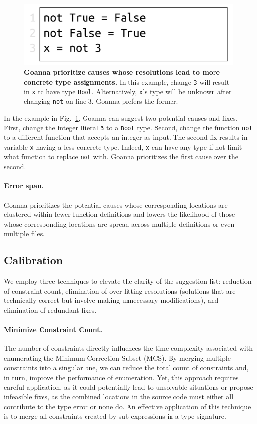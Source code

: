 \documentclass[pdflatex,sn-mathphys-num]{sn-jnl}%
\begin{document}
	
   \begin{figure}[ht!]
        \centering
        \includegraphics[width=0.5\linewidth]{images/Specificity}
        \caption[Goanna prioritize causes whose resolutions lead to more concrete type assignments]{\textbf{Goanna prioritize causes whose resolutions lead to more concrete type assignments.} In this example, change \texttt{3} will result in \texttt{x} to have type \texttt{Bool}. Alternatively, \texttt{x}'s type will be unknown after changing \texttt{not} on line 3. Goanna prefers the former.} 
        \label{fig:specificity}
    \end{figure}

    In the example in Fig.~\ref{fig:specificity}, Goanna can suggest two potential causes and fixes. First, change the integer literal \texttt{3} to a \texttt{Bool} type. Second, change the function \texttt{not} to a different function that accepts an integer as input. The second fix results in variable \texttt{x} having a less concrete type. Indeed, \texttt{x} can have any type if not limit what function to replace \texttt{not} with. Goanna prioritizes the first cause over the second. 

    \paragraph{Error span.}
    Goanna prioritizes the potential causes whose corresponding locations are clustered within fewer function definitions and lowers the likelihood of those whose corresponding locations are spread across multiple definitions or even multiple files.  

    
    \subsection{Calibration} \label{sub:optimization}
    
    We employ three techniques to elevate the clarity of the suggestion list: reduction of constraint count, elimination of over-fitting resolutions (solutions that are technically correct but involve making unnecessary modifications), and elimination of redundant fixes.

    \paragraph{Minimize Constraint Count.}
    The number of constraints directly influences the time complexity associated with enumerating the Minimum Correction Subset (MCS). By merging multiple constraints into a singular one, we can reduce the total count of constraints and, in turn, improve the performance of enumeration. Yet, this approach requires careful application, as it could potentially lead to unsolvable situations or propose infeasible fixes, as the combined locations in the source code must either all contribute to the type error or none do. An effective application of this technique is to merge all constraints created by sub-expressions in a type signature.
\end{document}
